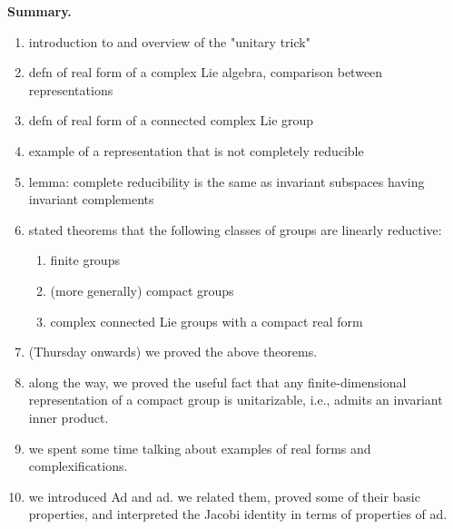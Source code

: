 \documentclass[reqno]{amsart} 
\begin{document}
\textbf{Summary.}
\begin{enumerate}
\item introduction to and overview of the "unitary trick"
\item defn of real form of a complex Lie algebra, comparison between representations
\item defn of real form of a connected complex Lie group
\item example of a representation that is not completely reducible
\item lemma: complete reducibility is the same as invariant subspaces having invariant complements
\item stated theorems that the following classes of groups are linearly reductive:
  \begin{enumerate}
  \item finite groups
  \item (more generally) compact groups
  \item complex connected Lie groups with a compact real form
  \end{enumerate}
\item (Thursday onwards) we proved the above theorems.
\item along the way, we proved the useful fact that any finite-dimensional representation of a compact group is unitarizable, i.e., admits an invariant inner product.
\item we spent some time talking about examples of real forms and complexifications.
\item we introduced Ad and ad.  we related them, proved some of their basic properties, and interpreted the Jacobi identity in terms of properties of ad.
\end{enumerate}
\end{document}
